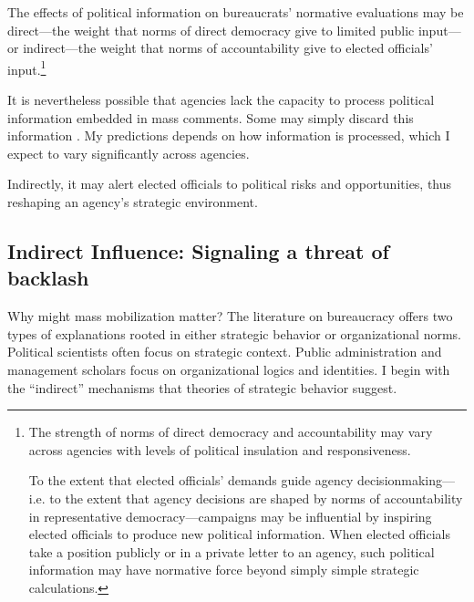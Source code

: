 The effects of political information on bureaucrats' normative evaluations may be
direct---the weight that norms of direct democracy give to limited public input---or 
indirect---the weight that norms of accountability give to elected officials' input.\footnote{
The strength of norms of direct democracy and accountability may vary across agencies with levels of political insulation and responsiveness.

To the extent that elected officials' demands guide agency decisionmaking---i.e. to the extent that agency decisions are shaped by norms of accountability in representative democracy---campaigns may be influential by inspiring elected officials to produce new political information. When elected officials take a position publicly or in a private letter to an agency, such political information may have normative force beyond simply simple strategic calculations.
}  




It is nevertheless possible that agencies lack the capacity to process political information embedded in mass comments. Some may simply discard this information \citep{Mendelson2011}. My predictions depends on how information is processed, which I expect to vary significantly across agencies. 

Indirectly, it may alert elected officials to political risks and opportunities, thus reshaping an agency's strategic environment.


\subsection{Indirect Influence: Signaling a threat of backlash}
Why might mass mobilization matter? The literature on bureaucracy offers two types of explanations rooted in either strategic behavior or organizational norms. Political scientists often focus on strategic context. Public administration and management scholars focus on organizational logics and identities. I begin with the ``indirect'' mechanisms that theories of strategic behavior suggest. 

